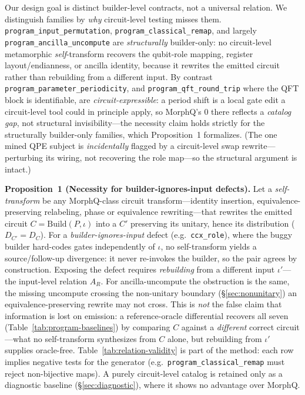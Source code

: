 

Our design goal is distinct builder-level contracts, not a universal relation. We distinguish families by \emph{why} circuit-level testing misses them. \texttt{program\_input\_permutation}, \texttt{program\_classical\_remap}, and largely \texttt{program\_ancilla\_uncompute} are \emph{structurally} builder-only: no circuit-level metamorphic \emph{self}-transform recovers the qubit-role mapping, register layout/endianness, or ancilla identity, because it rewrites the emitted circuit rather than rebuilding from a different input. By contrast \texttt{program\_parameter\_periodicity}, and \texttt{program\_qft\_round\_trip} where the QFT block is identifiable, are \emph{circuit-expressible}: a period shift is a local gate edit a circuit-level tool could in principle apply, so MorphQ's $0$ there reflects a \emph{catalog gap}, not structural invisibility---the necessity claim holds strictly for the structurally builder-only families, which Proposition~1 formalizes. (The one mined QPE subject is \emph{incidentally} flagged by a circuit-level swap rewrite---perturbing its wiring, not recovering the role map---so the structural argument is intact.)

\noindent\textbf{Proposition~1 (Necessity for builder-ignores-input defects).}
\label{prop:necessity}
Let a \emph{self-transform} be any MorphQ-class circuit transform---identity insertion, equivalence-preserving relabeling, phase or equivalence rewriting---that rewrites the emitted circuit $C=\mathrm{Build}(P,\iota)$ into a $C'$ preserving its unitary, hence its distribution ($D_{C'}=D_C$). For a \emph{builder-ignores-input} defect (e.g.\ \texttt{ccx\_role}), where the buggy builder hard-codes gates independently of $\iota$, no self-transform yields a source/follow-up divergence: it never re-invokes the builder, so the pair agrees by construction. Exposing the defect requires \emph{rebuilding} from a different input $\iota'$---the input-level relation $A_R$. For ancilla-uncompute the obstruction is the same, the missing uncompute crossing the non-unitary boundary (\S\ref{sec:nonunitary}) an equivalence-preserving rewrite may not cross. This is \emph{not} the false claim that information is lost on emission: a reference-oracle differential recovers all seven (Table~\ref{tab:program-baselines}) by comparing $C$ against a \emph{different} correct circuit---what no self-transform synthesizes from $C$ alone, but rebuilding from $\iota'$ supplies oracle-free. Table~\ref{tab:relation-validity} is part of the method: each row implies negative tests for the generator (e.g.\ \texttt{program\_classical\_remap} must reject non-bijective maps). A purely circuit-level catalog is retained only as a diagnostic baseline (\S\ref{sec:diagnostic}), where it shows no advantage over MorphQ.

